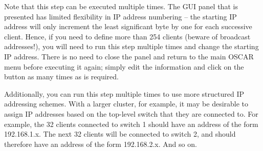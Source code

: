 
Note that this step can be executed multiple times.  The GUI panel
that is presented has limited flexibility in IP address numbering --
the starting IP address will only increment the least significant byte
by one for each successive client.  Hence, if you need to define more
than 254 clients (beware of broadcast addresses!), you will need to
run this step multiple times and change the starting IP address.
There is no need to close the panel and return to the main OSCAR menu
before executing it again; simply edit the information and click on
the  button as many times as is required.

Additionally, you can run this step multiple times to use more
structured IP addressing schemes.  With a larger cluster, for example,
it may be desirable to assign IP addresses based on the top-level
switch that they are connected to.  For example, the 32 clients
connected to switch 1 should have an address of the form 192.168.1.x.
The next 32 clients will be connected to switch 2, and should
therefore have an address of the form 192.168.2.x.  And so on.

